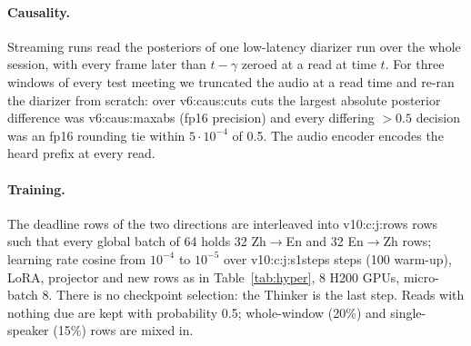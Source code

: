 \paragraph{Causality.} Streaming runs read the posteriors of one low-latency diarizer run over the whole session, with
every frame later than $t-\gamma$ zeroed at a read at time $t$. For three windows of every test meeting we truncated the
audio at a read time and re-ran the diarizer from scratch: over \num{v6:caus:cuts} cuts the largest absolute posterior
difference was \num{v6:caus:maxabs} (fp16 precision) and every differing $>0.5$ decision was an fp16 rounding tie
within $5\cdot10^{-4}$ of 0.5. The audio encoder encodes the heard prefix at every read.

\paragraph{Training.} The deadline rows of the two directions are interleaved into \num{v10:c:j:rows} rows such that
every global batch of 64 holds 32 Zh$\rightarrow$En and 32 En$\rightarrow$Zh rows; learning rate cosine from $10^{-4}$
to $10^{-5}$ over \num{v10:c:j:s1steps} steps (100 warm-up), LoRA, projector and new rows as in Table~\ref{tab:hyper},
8 H200 GPUs, micro-batch 8. There is no checkpoint selection: the Thinker is the last step. Reads with nothing due are
kept with probability 0.5; whole-window (20\%) and single-speaker (15\%) rows are mixed in.

\begin{table}[h]
\centering\small
\setlength{\tabcolsep}{3pt}
\caption{Training hyperparameters (\sys{}-Simul: En$\rightarrow$Zh / Zh$\rightarrow$En). The streaming Thinker of
\sys{} is one bidirectional model trained like \sys{}-Simul on the rows of both directions.}
\label{tab:hyper}
\end{table}

